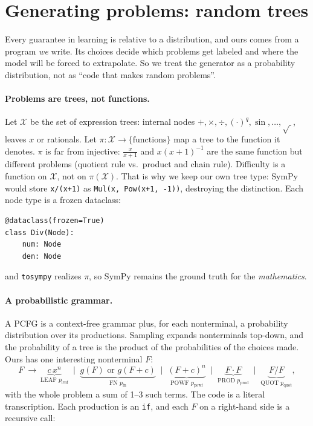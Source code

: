 \documentclass[11pt]{article}
\theoremstyle{definition}
\theoremstyle{plain}
\theoremstyle{remark}
\newcommand{\X}{\mathcal{X}}
\newcommand{\code}[1]{\texttt{#1}}
\renewcommand{\_}{\oldunderscore\allowbreak}
\newcommand{\file}[1]{\textcolor{blue!50!black}{\texttt{#1}}}
\newcommand{\codefrom}[1]{\par\smallskip\noindent{\footnotesize\textbf{From} \file{#1}}}
\begin{document}
\section{Generating problems: random trees}
\label{sec:generation}

Every guarantee in learning is relative to a distribution, and ours comes from a
program \emph{we} write. Its choices decide which problems get labeled and where the
model will be forced to extrapolate. So we treat the generator as a probability
distribution, not as ``code that makes random problems''.

\paragraph{Problems are trees, not functions.}
Let $\X$ be the set of expression trees: internal nodes $+,\times,\div,(\cdot)^q,\sin,\dots,\sqrt{\ }$,
leaves $x$ or rationals. Let $\pi:\X\to\{\text{functions}\}$ map a tree to the function it denotes.
$\pi$ is far from injective: $\frac{x}{x+1}$ and $x(x+1)^{-1}$ are the same function but
different problems (quotient rule vs.\ product and chain rule). Difficulty is a function on $\X$,
not on $\pi(\X)$. That is why we keep our own tree type: SymPy would store \code{x/(x+1)} as
\code{Mul(x, Pow(x+1, -1))}, destroying the distinction. Each node type is a frozen dataclass:

\codefrom{src/calcdiff/expr.py}
\begin{lstlisting}
@dataclass(frozen=True)
class Div(Node):
    num: Node
    den: Node
\end{lstlisting}
\noindent and \code{to\_sympy} realizes $\pi$, so SymPy remains the ground truth for the \emph{mathematics}.

\paragraph{A probabilistic grammar.}
A PCFG is a context-free grammar plus, for each nonterminal, a probability
distribution over its productions. Sampling expands nonterminals top-down, and the
probability of a tree is the product of the probabilities of the choices made. Ours
has one interesting nonterminal $F$:
\[
F\ \to\ \underbrace{c\,x^n}_{\text{LEAF } p_{\mathrm{leaf}}}
\;\mid\; \underbrace{g(F)\text{ or } g(F{+}c)}_{\text{FN } p_{\mathrm{fn}}}
\;\mid\; \underbrace{(F{+}c)^n}_{\text{POWF } p_{\mathrm{powf}}}
\;\mid\; \underbrace{F\cdot F}_{\text{PROD } p_{\mathrm{prod}}}
\;\mid\; \underbrace{F/F}_{\text{QUOT } p_{\mathrm{quot}}},
\]
with the whole problem a sum of 1--3 such terms. The code is a literal transcription.
Each production is an \code{if}, and each $F$ on a right-hand side is a recursive call:
\end{document}
